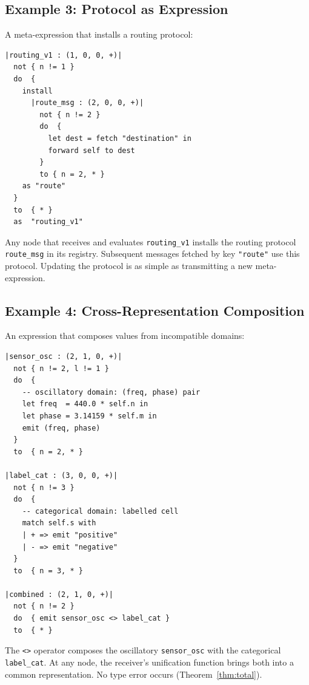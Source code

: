 \documentclass[twocolumn,11pt,a4paper]{article}
\theoremstyle{definition}
\theoremstyle{remark}
\begin{document}
\subsection{Example 3: Protocol as Expression}

A meta-expression that installs a routing protocol:

\begin{lstlisting}[caption={Protocol meta-expression}, label={lst:ex3}]
|routing_v1 : (1, 0, 0, +)|
  not { n != 1 }
  do  {
    install
      |route_msg : (2, 0, 0, +)|
        not { n != 2 }
        do  {
          let dest = fetch "destination" in
          forward self to dest
        }
        to { n = 2, * }
    as "route"
  }
  to  { * }
  as  "routing_v1"
\end{lstlisting}

Any node that receives and evaluates \lstinline|routing_v1| installs
the routing protocol \lstinline|route_msg| in its registry.  Subsequent
messages fetched by key \lstinline|"route"| use this protocol.  Updating
the protocol is as simple as transmitting a new meta-expression.

\subsection{Example 4: Cross-Representation Composition}

An expression that composes values from incompatible domains:

\begin{lstlisting}[caption={Cross-representation composition}, label={lst:ex4}]
|sensor_osc : (2, 1, 0, +)|
  not { n != 2, l != 1 }
  do  {
    -- oscillatory domain: (freq, phase) pair
    let freq  = 440.0 * self.n in
    let phase = 3.14159 * self.m in
    emit (freq, phase)
  }
  to  { n = 2, * }

|label_cat : (3, 0, 0, +)|
  not { n != 3 }
  do  {
    -- categorical domain: labelled cell
    match self.s with
    | + => emit "positive"
    | - => emit "negative"
  }
  to  { n = 3, * }

|combined : (2, 1, 0, +)|
  not { n != 2 }
  do  { emit sensor_osc <> label_cat }
  to  { * }
\end{lstlisting}

The \lstinline|<>| operator composes the oscillatory
\lstinline|sensor_osc| with the categorical \lstinline|label_cat|.
At any node, the receiver's unification function brings both into
a common representation.  No type error occurs
(Theorem~\ref{thm:total}).
\end{document}
